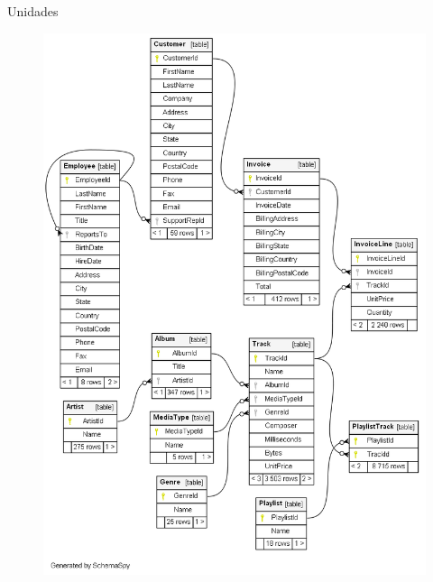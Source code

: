 \documentclass{beamer}
\begin{document}
\begin{frame}{Unidades}
{\begin{figure}
    \includegraphics[scale=0.2]{img/db-uml.png}
 \end{figure}
}
\end{frame}
\end{document}
